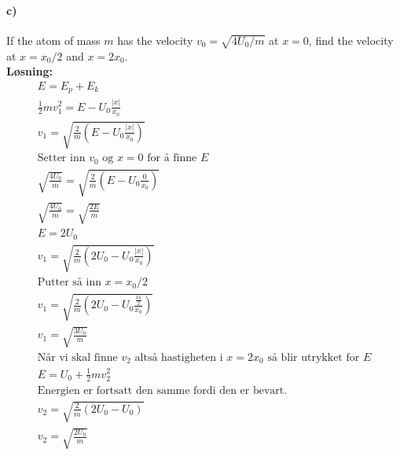 \documentclass[11pt, A4paper,norsk]{article}
\begin{document}
		\paragraph{c)}
			\begin{flushleft}
If the atom of mass $m$ has the velocity $v_0 = \sqrt{4U_0/m}$ at $x = 0$, find the velocity at $x = x_0/2$ and $x = 2x_0$. \\
\vspace{1mm}
\textbf{Løsning:} \\
\vspace{1mm}
				\begin{align}
E = E_p + E_k \nonumber \\
\frac{1}{2}mv_{1}^2 = E - U_0\frac{|x|}{x_0} \nonumber \\
v_1 = \sqrt{\frac{2}{m} \left(E - U_0 \frac{|x|}{x_0} \right)} \nonumber \\
\text{Setter inn $v_0$ og $x = 0$ for å finne $E$} \nonumber \\
\sqrt{\frac{4 U_0}{m}} = \sqrt{\frac{2}{m} \left(E - U_0 \frac{0}{x_0} \right)} \nonumber \\
\sqrt{\frac{4 U_0}{m}} = \sqrt{\frac{2 E}{m}} \nonumber \\
E = 2U_0 \nonumber \\
v_1 = \sqrt{\frac{2}{m} \left(2U_0 - U_0 \frac{|x|}{x_0} \right)} \nonumber \\
\text{Putter så inn $x = x_0/2$} \nonumber \\
v_1 = \sqrt{\frac{2}{m} \left(2U_0 - U_0 \frac{\frac{x_0}{2}}{x_0}\right)} \nonumber \\
v_1 = \sqrt{\frac{3U_0}{m}} \nonumber \\
\text{Når vi skal finne $v_2$ altså hastigheten i $x = 2x_0$ så blir utrykket for $E$} \nonumber \\
E = U_0 + \frac{1}{2} m v_2^2 \nonumber \\
\text{Energien er fortsatt den samme fordi den er bevart.} \nonumber \\
v_2 = \sqrt{\frac{2}{m}(2U_0 - U_0)} \nonumber \\
v_2 = \sqrt{\frac{2 U_0}{m}} \nonumber
				\end{align}
			\end{flushleft}
\end{document}
